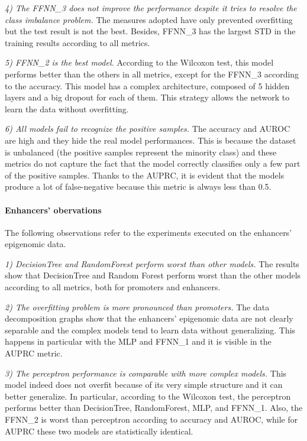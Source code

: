 \emph{4) The FFNN\_3 does not improve the performance despite it tries to
resolve the class imbalance problem.} The measures adopted have only
prevented overfitting but the test result is not the best. Besides,
FFNN\_3 has the largest STD in the training results according to all
metrics.

\emph{5) FFNN\_2 is the best model.} According to the Wilcoxon test,
this model performs better than the others in all metrics, except for
the FFNN\_3 according to the accuracy. This model has a complex
architecture, composed of 5 hidden layers and a big dropout for each of
them. This strategy allows the network to learn the data without
overfitting.

\emph{6) All models fail to recognize the positive samples.} The
accuracy and AUROC are high and they hide the real model performances.
This is because the dataset is unbalanced (the positive samples
represent the minority class) and these metrics do not capture the fact
that the model correctly classifies only a few part of the positive
samples. Thanks to the AUPRC, it is evident that the models produce a
lot of false-negative because this metric is always less than 0.5.
\newline
\paragraph{Enhancers' obervations}
The following observations refer to the experiments executed on the enhancers' epigenomic data.
\newline
\par
\emph{1) DecisionTree and RandomForest perform worst than other models.}
The results show that DecisionTree and Random Forest perform worst than
the other models according to all metrics, both for promoters and
enhancers.

\emph{2) The overfitting problem is more pronounced than promoters.} The
data decomposition graphs show that the enhancers' epigenomic data are
not clearly separable and the complex models tend to learn data without
generalizing. This happens in particular with the MLP and FFNN\_1 and it
is visible in the AUPRC metric.

\emph{3) The perceptron performance is comparable with more complex
models.} This model indeed does not overfit because of its very simple
structure and it can better generalize. In particular, according to the
Wilcoxon test, the perceptron performs better than DecisionTree,
RandomForest, MLP, and FFNN\_1. Also, the FFNN\_2 is worst than
perceptron according to accuracy and AUROC, while for AUPRC these two
models are statistically identical.

